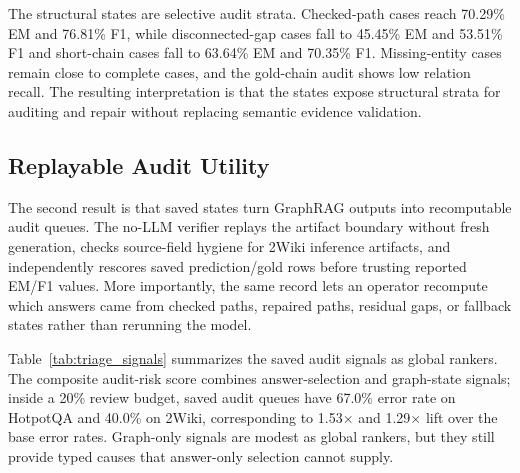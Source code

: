 \documentclass[runningheads,a4paper]{llncs}
\begin{document}
The structural states are selective audit strata. Checked-path cases reach
70.29\% EM and 76.81\% F1, while disconnected-gap cases fall to 45.45\% EM and
53.51\% F1 and short-chain cases fall to 63.64\% EM and 70.35\% F1.
Missing-entity cases remain close to complete cases, and the gold-chain audit
shows low relation recall. The resulting interpretation is that the states
expose structural strata for auditing and repair without replacing semantic
evidence validation.

\subsection{Replayable Audit Utility}

The second result is that saved states turn GraphRAG outputs into recomputable
audit queues. The no-LLM verifier replays the artifact boundary without fresh
generation, checks source-field hygiene for 2Wiki inference artifacts, and
independently rescores saved prediction/gold rows before trusting reported EM/F1
values. More importantly, the same record lets an operator recompute which
answers came from checked paths, repaired paths, residual gaps, or fallback
states rather than rerunning the model.

Table~\ref{tab:triage_signals} summarizes the saved audit signals as global
rankers. The composite audit-risk score combines answer-selection and graph-state
signals; inside a 20\% review budget, saved audit queues have 67.0\% error rate
on HotpotQA and 40.0\% on 2Wiki, corresponding to 1.53$\times$ and
1.29$\times$ lift over the base error rates. Graph-only signals are modest as
global rankers, but they still provide typed causes that answer-only selection
cannot supply.

\begin{table}[!htbp]
\centering
\caption{Triage utility of saved audit signals. AUC detects answer errors;
top-20 error is the error rate among the highest-risk 20\% examples, and lift is
relative to each dataset's base error rate.}
\label{tab:triage_signals}
\scriptsize
\setlength{\tabcolsep}{1.6pt}
\end{table}
\end{document}
